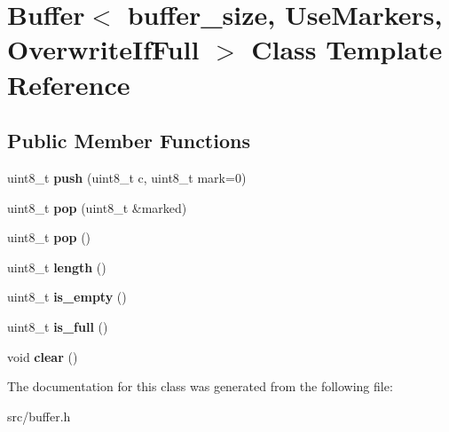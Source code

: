 \hypertarget{classBuffer}{}\section{Buffer$<$ buffer\+\_\+size, Use\+Markers, Overwrite\+If\+Full $>$ Class Template Reference}
\label{classBuffer}
\subsection*{Public Member Functions}
\begin{DoxyCompactItemize}
\item 
\hypertarget{classBuffer_a1ca7045e009384d8eaff94b7518058eb}{}\label{classBuffer_a1ca7045e009384d8eaff94b7518058eb} 
uint8\+\_\+t {\bfseries push} (uint8\+\_\+t c, uint8\+\_\+t mark=0)
\item 
\hypertarget{classBuffer_a19f5c6bd4c300bf47929cee37acb3e57}{}\label{classBuffer_a19f5c6bd4c300bf47929cee37acb3e57} 
uint8\+\_\+t {\bfseries pop} (uint8\+\_\+t \&marked)
\item 
\hypertarget{classBuffer_a245e9f05625b8baa166c925161557043}{}\label{classBuffer_a245e9f05625b8baa166c925161557043} 
uint8\+\_\+t {\bfseries pop} ()
\item 
\hypertarget{classBuffer_a8ba075fa0afc01604b3ea29fd4785dc8}{}\label{classBuffer_a8ba075fa0afc01604b3ea29fd4785dc8} 
uint8\+\_\+t {\bfseries length} ()
\item 
\hypertarget{classBuffer_af065fa47b206c64cebc30cc39cf23e9c}{}\label{classBuffer_af065fa47b206c64cebc30cc39cf23e9c} 
uint8\+\_\+t {\bfseries is\+\_\+empty} ()
\item 
\hypertarget{classBuffer_a57072cfbd2259df62aeb5f40245b0f93}{}\label{classBuffer_a57072cfbd2259df62aeb5f40245b0f93} 
uint8\+\_\+t {\bfseries is\+\_\+full} ()
\item 
\hypertarget{classBuffer_a521c50ae0048af777bdbb930e2c5b5d3}{}\label{classBuffer_a521c50ae0048af777bdbb930e2c5b5d3} 
void {\bfseries clear} ()
\end{DoxyCompactItemize}


The documentation for this class was generated from the following file\+:\begin{DoxyCompactItemize}
\item 
src/buffer.\+h\end{DoxyCompactItemize}
